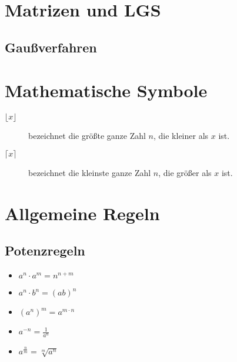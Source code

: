 \documentclass[10pt,a4paper,twoside,twocolumn]{article}
\begin{document}
	
	\section{Matrizen und LGS}
	
	\subsection{Gaußverfahren}
	
	
	
	\section{Mathematische Symbole}

	\begin{description}
		\item[$ \lfloor x \rfloor $] bezeichnet die größte ganze Zahl $ n $, die kleiner als $ x $ ist.
		\item[$ \lceil x \rceil $] bezeichnet die kleinste ganze Zahl $ n $, die größer als $ x $ ist.
	\end{description}

	\section{Allgemeine Regeln}
	
	\subsection{Potenzregeln}
	
	\begin{itemize}
		\setlength\itemsep{0em}
		\item $ a^n \cdot a^m = n^{n+m} $
		\item $ a^n \cdot b^n = (ab)^n $
		\item $ {(a^n)}^m = a^{m \cdot n} $
		\item $ a^{-n} = \frac{1}{a^n} $
		\item $ a^{\frac{n}{m}} = \sqrt[m]{a^n} $
	\end{itemize}
\end{document}

